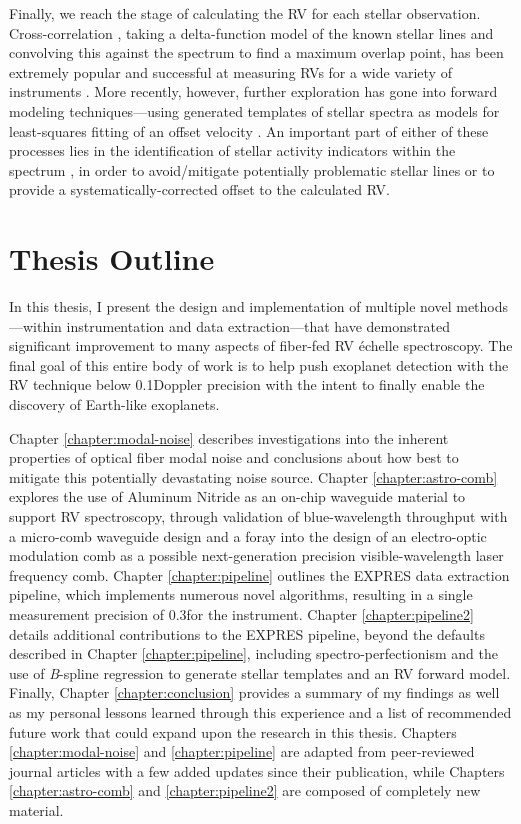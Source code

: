 Finally, we reach the stage of calculating the RV for each stellar observation. Cross-correlation \citep{baranne_coravel_1979}, taking a delta-function model of the known stellar lines and convolving this against the spectrum to find a maximum overlap point, has been extremely popular and successful at measuring RVs for a wide variety of instruments \citep[e.g.][]{freudling_automated_2013, brahm_ceres_2017, modigliani_espresso_2019}. More recently, however, further exploration has gone into forward modeling techniques---using generated templates of stellar spectra as models for least-squares fitting of an offset velocity \citep[e.g.][]{zechmeister_spectrum_2018, rajpaul_robust_2020}. An important part of either of these processes lies in the identification of stellar activity indicators within the spectrum \citep[e.g.][]{davis_insights_2017, dumusque_measuring_2018}, in order to avoid/mitigate potentially problematic stellar lines or to provide a systematically-corrected offset to the calculated RV.

\section{Thesis Outline} \label{intro:structure}

In this thesis, I present the design and implementation of multiple novel methods---within instrumentation and data extraction---that have demonstrated significant improvement to many aspects of fiber-fed RV \'echelle spectroscopy. The final goal of this entire body of work is to help push exoplanet detection with the RV technique below 0.1\ms Doppler precision with the intent to finally enable the discovery of Earth-like exoplanets.

Chapter \ref{chapter:modal-noise} describes investigations into the inherent properties of optical fiber modal noise and conclusions about how best to mitigate this potentially devastating noise source. Chapter \ref{chapter:astro-comb} explores the use of Aluminum Nitride as an on-chip waveguide material to support RV spectroscopy, through validation of blue-wavelength throughput with a micro-comb waveguide design and a foray into the design of an electro-optic modulation comb as a possible next-generation precision visible-wavelength laser frequency comb. Chapter \ref{chapter:pipeline} outlines the EXPRES data extraction pipeline, which implements numerous novel algorithms, resulting in a single measurement precision of 0.3\ms for the instrument. Chapter \ref{chapter:pipeline2} details additional contributions to the EXPRES pipeline, beyond the defaults described in Chapter \ref{chapter:pipeline}, including spectro-perfectionism and the use of \textit{B}-spline regression to generate stellar templates and an RV forward model. Finally, Chapter \ref{chapter:conclusion} provides a summary of my findings as well as my personal lessons learned through this experience and a list of recommended future work that could expand upon the research in this thesis. Chapters \ref{chapter:modal-noise} and \ref{chapter:pipeline} are adapted from peer-reviewed journal articles with a few added updates since their publication, while Chapters \ref{chapter:astro-comb} and \ref{chapter:pipeline2} are composed of completely new material. 